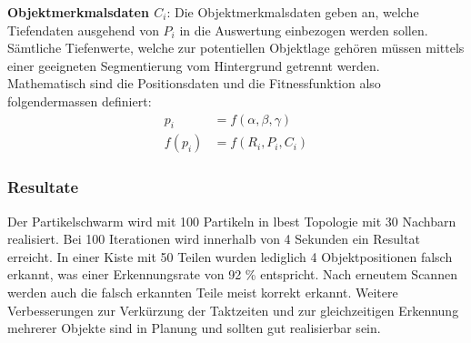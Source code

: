 \textbf{Objektmerkmalsdaten $C_i$}: Die Objektmerkmalsdaten geben an, welche Tiefendaten ausgehend von $P_i$ in die Auswertung einbezogen werden sollen. Sämtliche Tiefenwerte, welche zur potentiellen Objektlage gehören müssen mittels einer geeigneten Segmentierung vom Hintergrund getrennt werden. \\

Mathematisch sind die Positionsdaten und die Fitnessfunktion also folgendermassen definiert: 
\begin{align}
	p_i &= f(\alpha ,\beta ,\gamma) \\
	f(p_i) &= f(R_i,P_i,C_i)
\end{align}

\subsubsection{Resultate}
Der Partikelschwarm wird mit 100 Partikeln in lbest Topologie mit 30 Nachbarn realisiert. Bei 100 Iterationen wird innerhalb von 4 Sekunden ein Resultat erreicht. In einer Kiste mit 50 Teilen wurden lediglich 4 Objektpositionen falsch erkannt, was einer Erkennungsrate von 92 \% entspricht. Nach erneutem Scannen werden auch die falsch erkannten Teile meist korrekt erkannt. Weitere Verbesserungen zur Verkürzung der Taktzeiten und zur gleichzeitigen Erkennung  mehrerer Objekte sind in Planung und sollten gut realisierbar sein.